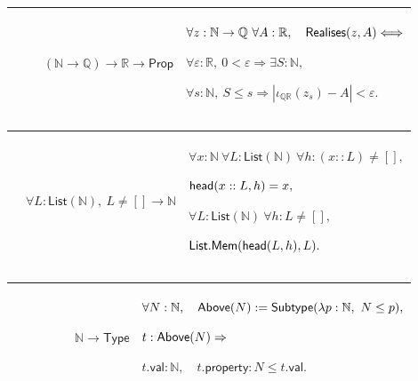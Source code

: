 \documentclass[12pt,reqno]{amsart}
\theoremstyle{blueplain}
\newcounter{type}
\numberwithin{equation}{section}
\begin{document}
{\scriptsize \setlength{\parskip}{0pt}\nointerlineskip
\noindent 
\begin{tabular}{|@{}>{\centering\arraybackslash}m{0.19251\linewidth}|>{\centering\arraybackslash}m{0.16845\linewidth}|>{\centering\arraybackslash}m{0.53904\linewidth}|}
\hline
{\hypertarget{def:Realises}{$\mathsf{Realises}$}} & {$(\mathbb{N}\to\mathbb{Q%
})\to\mathbb{R}\to\mathsf{Prop}$} & {$\displaystyle \forall z:\mathbb{N}\to%
\mathbb{Q}\ \forall A:\mathbb{R},\quad \hyperlink{def:Realises}{\mathsf{%
Realises} }(z,A)\Longleftrightarrow$ \par$\displaystyle \forall\varepsilon:%
\mathbb{R},\ 0<\varepsilon\Rightarrow\exists S:\mathbb{N},$ \par$%
\displaystyle \forall s:\mathbb{N},\ S\le s\Rightarrow|\iota_{\mathbb{Q}%
\mathbb{R}}(z_s)-A|<\varepsilon.$} \\ \hline
\end{tabular}%
}

{\scriptsize \setlength{\parskip}{0pt}\nointerlineskip
\noindent 
\begin{tabular}{|@{}>{\centering\arraybackslash}m{0.19251\linewidth}|>{\centering\arraybackslash}m{0.16845\linewidth}|>{\centering\arraybackslash}m{0.53904\linewidth}|}
\hline
{\hypertarget{def:head}{$\mathsf{head}$}} & {$\forall L:\mathsf{List}(%
\mathbb{N}),\ L\ne[]\to\mathbb{N}$} & {$\displaystyle \forall x:\mathbb{N}\
\forall L:\mathsf{List}(\mathbb{N})\ \forall h:(x::L)\ne[],$ \par$%
\displaystyle \hyperlink{def:head}{\mathsf{head} }(x::L,h)=x,$ \par$%
\displaystyle \forall L:\mathsf{List}(\mathbb{N})\ \forall h:L\ne[],$ \par$%
\displaystyle \mathsf{List.Mem}(\hyperlink{def:head}{\mathsf{head} }%
(L,h),L). $} \\ \hline
\end{tabular}%
}

{\scriptsize \setlength{\parskip}{0pt}\nointerlineskip
\noindent 
\begin{tabular}{|@{}>{\centering\arraybackslash}m{0.19251\linewidth}|>{\centering\arraybackslash}m{0.16845\linewidth}|>{\centering\arraybackslash}m{0.53904\linewidth}|}
\hline
{\hypertarget{def:Above}{$\mathsf{Above}$}} & {$\mathbb{N}\to\mathsf{Type}$}
& {$\displaystyle \forall N:\mathbb{N},\quad \hyperlink{def:Above}{\mathsf{%
Above} }(N):=\mathsf{Subtype}(\lambda p:\mathbb{N},\ N\le p),$ \par$%
\displaystyle t:\hyperlink{def:Above}{\mathsf{Above} }(N)\Rightarrow$ \par$%
\displaystyle t.\mathsf{val}:\mathbb{N},\quad t.\mathsf{property}:N\le t.%
\mathsf{val}.$} \\ \hline
\end{tabular}
}
\end{document}
